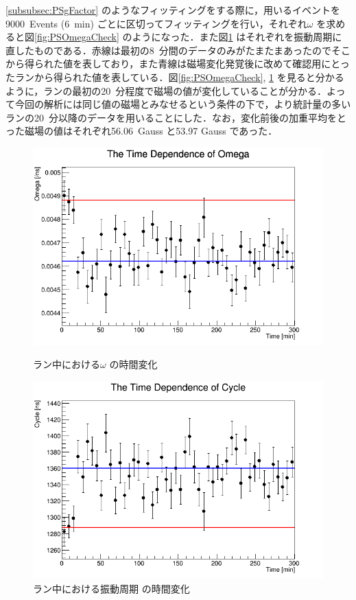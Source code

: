 \ref{subsubsec:PSgFactor} のようなフィッティングをする際に，用いるイベントを9000~Events (6~min) ごとに区切ってフィッティングを行い，それぞれ$\omega$ を求めると図\ref{fig:PSOmegaCheck} のようになった．また図\ref{fig:PSCycleCheck} はそれぞれを振動周期に直したものである．赤線は最初の8~分間のデータのみがたまたまあったのでそこから得られた値を表しており，また青線は磁場変化発覚後に改めて確認用にとったランから得られた値を表している．図\ref{fig:PSOmegaCheck}, \ref{fig:PSCycleCheck} を見ると分かるように，ランの最初の20~分程度で磁場の値が変化していることが分かる．よって今回の解析には同じ値の磁場とみなせるという条件の下で，より統計量の多いランの20~分以降のデータを用いることにした．なお，変化前後の加重平均をとった磁場の値はそれぞれ56.06~Gauss と53.97 Gauss であった．

\begin{figure}[h]
	\centering
	\begin{minipage}{0.45\textwidth}
	\centering
	\includegraphics[width = \textwidth]{figure/odagawa/PSOmegaCheck.png}
	\caption{ラン中における$\omega$ の時間変化}
	\label{fig:PSOmegaCheck}
	\end{minipage}
	\begin{minipage}{0.45\textwidth}
	\centering
	\includegraphics[width = \textwidth]{figure/odagawa/PSCycleCheck.png}
	\caption{ラン中における振動周期 の時間変化}
	\label{fig:PSCycleCheck}
	\end{minipage}
\end{figure}

